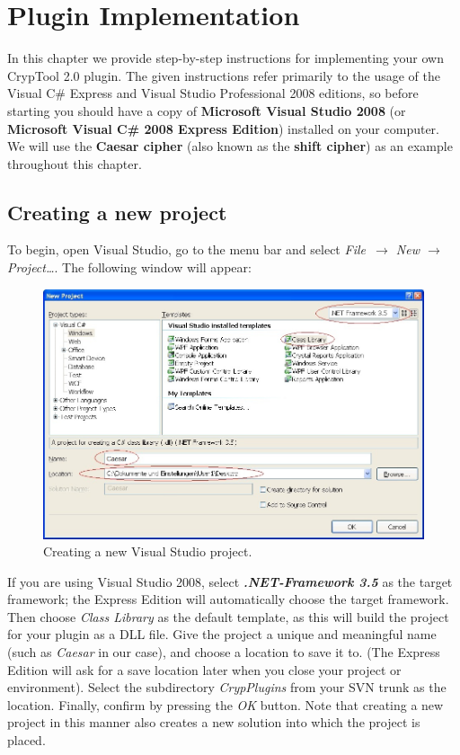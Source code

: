 \chapter{Plugin Implementation}
\label{sec:PluginImplementation}
In this chapter we provide step-by-step instructions for implementing your own CrypTool 2.0 plugin. The given instructions refer primarily to the usage of the Visual C\# Express and Visual Studio Professional 2008 editions, so before starting you should have a copy of \textbf{Microsoft Visual Studio 2008} (or \textbf{Microsoft Visual C\# 2008 Express Edition}) installed on your computer. We will use the \textbf{Caesar cipher} (also known as the \textbf{shift cipher}) as an example throughout this chapter.

\section{Creating a new project}
\label{sec:CreatingANewProject}

To begin, open Visual Studio, go to the menu bar and select \textit{File~$\rightarrow$ New $\rightarrow$ Project\ldots }. The following window will appear:

\begin{figure}[h!]
	\centering
		\includegraphics[width=1.00\textwidth]{figures/vs_create_new_project.jpg}
	\caption{Creating a new Visual Studio project.}
	\label{fig:vs_create_new_project}
\end{figure}

\noindent If you are using Visual Studio 2008, select \textbf{\textit{.NET-Framework 3.5}} as the target framework; the Express Edition will automatically choose the target framework. Then choose \textit{Class Library} as the default template, as this will build the project for your plugin as a DLL file. Give the project a unique and meaningful name (such as \textit{Caesar} in our case), and choose a location to save it to. (The Express Edition will ask for a save location later when you close your project or environment). Select the subdirectory \textit{CrypPlugins} from your SVN trunk as the location. Finally, confirm by pressing the \textit{OK} button. Note that creating a new project in this manner also creates a new solution into which the project is placed.

